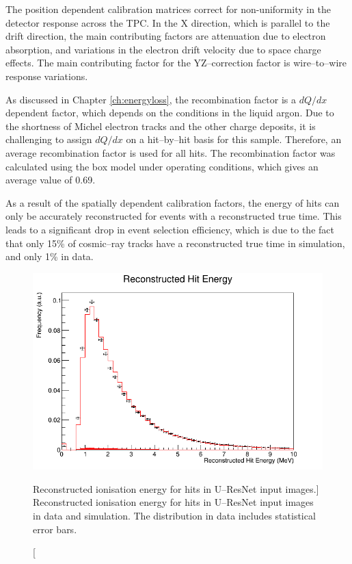 The position dependent calibration matrices correct for non-uniformity in the
detector response across the TPC. In the X direction, which is parallel to the
drift direction, the main contributing factors are attenuation due to electron 
absorption, and variations in the electron drift velocity due to space charge 
effects. The main contributing factor for the YZ--correction factor is 
wire--to--wire response variations. 

As discussed in Chapter \ref{ch:energyloss}, the recombination factor is a
$dQ/dx$ dependent factor, which depends on the conditions in the liquid
argon. Due to the shortness of Michel electron tracks and the other charge 
deposits, it is challenging to assign $dQ/dx$ on a hit--by--hit basis for this 
sample. Therefore, an average recombination factor is used for all hits. The 
recombination factor was calculated using the box model\cite{Acciarri2013a} 
under \protodune{} operating conditions, which gives an average value of 0.69.

As a result of the spatially dependent calibration factors, the energy of hits 
can only be accurately reconstructed for events with a reconstructed true 
time. This leads to a significant drop in event selection efficiency, which is 
due to the fact that only 15\% of cosmic--ray tracks have a reconstructed true 
time in simulation, and only 1\% in data.

\begin{figure}
	\centering
	\includegraphics[width=\textwidth]{figures/hit_ion_reco.png}
	\caption
	[Reconstructed ionisation energy for hits in U--ResNet input images.]
	{Reconstructed ionisation energy for hits in U--ResNet input images 
	in data and simulation. The distribution in data includes statistical error
	bars.}
	\label{fig:hit_ion_reco}
\end{figure}

